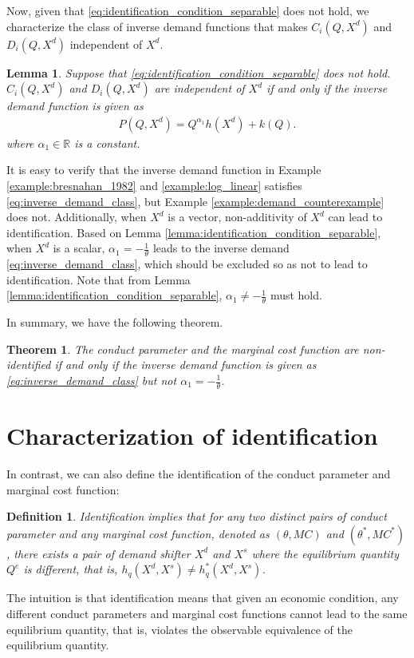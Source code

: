 \documentclass[11pt, a4paper]{article}
\newtheorem{theorem}{Theorem}
\newtheorem{lemma}{Lemma}
\newtheorem{definition}{Definition}
\theoremstyle{remark}
\begin{document}
Now, given that \eqref{eq:identification_condition_separable} does not hold, we characterize the class of inverse demand functions that makes $C_i(Q, X^{d})$ and $D_i(Q, X^{d})$ independent of $X^{d}$.
\begin{lemma}\label{lemma:non-identification_inverse_demand}
    Suppose that \eqref{eq:identification_condition_separable} does not hold.
    $C_i(Q, X^{d})$ and $D_i(Q, X^{d})$ are independent of $X^{d}$ if and only if the inverse demand function is given as
    \begin{align}
        P(Q, X^{d}) = Q^{\alpha_1}h(X^{d}) + k(Q). \label{eq:inverse_demand_class}
    \end{align}
    where $\alpha_1 \in \mathbb{R}$ is a constant.
\end{lemma}
It is easy to verify that the inverse demand function in Example \ref{example:bresnahan_1982} and \ref{example:log_linear} satisfies \eqref{eq:inverse_demand_class}, but Example \ref{example:demand_counterexample} does not.
Additionally, when $X^{d}$ is a vector, non-additivity of $X^{d}$ can lead to identification.
Based on Lemma \ref{lemma:identification_condition_separable}, when $X^{d}$ is a scalar, $\alpha_1 = -\frac{1}{\theta}$ leads to the inverse demand \eqref{eq:inverse_demand_class}, which should be excluded so as not to lead to identification.
Note that from Lemma \ref{lemma:identification_condition_separable}, $\alpha_1 \ne -\frac{1}{\theta}$ must hold.





In summary, we have the following theorem.
\begin{theorem}\label{theorem:identification_characterization}
    The conduct parameter and the marginal cost function are non-identified if and only if the inverse demand function is given as \eqref{eq:inverse_demand_class} but not $\alpha_1 = -\frac{1}{\theta}$.
\end{theorem}







\section{Characterization of identification}\label{sec:identification_characterization}


In contrast, we can also define the identification of the conduct parameter and marginal cost function:
\begin{definition}\label{def:identification}
    Identification implies that for any two distinct pairs of conduct parameter and any marginal cost function, denoted as $(\theta, MC)$ and $(\theta^{*}, MC^{*})$, there exists a pair of demand shifter $X^{d}$ and $X^{s}$ where the equilibrium quantity $Q^e$ is different, that is, $h_q(X^{d}, X^{s}) \ne h_q^{*}(X^{d}, X^{s})$.
\end{definition}
The intuition is that identification means that given an economic condition, any different conduct parameters and marginal cost functions cannot lead to the same equilibrium quantity, that is, violates the observable equivalence of the equilibrium quantity.
\end{document}
